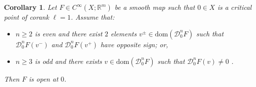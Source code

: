 \documentclass[12pt, reqno]{amsart}
\theoremstyle{plain}
\newtheorem {corollary} [theorem]{Corollary}
\theoremstyle{definition}
\theoremstyle{remark}
\numberwithin{equation}{section}
\newcommand{\R}{\mathbb{R}}
\newcommand{\0}{\theta}
\newcommand{\1}{{-1}}
\renewcommand{\l}{\ell}
\renewcommand{\=}{\coloneqq}
\renewcommand{\.}{\dots}
\newcommand{\mc}{\mathcal}
\newcommand{\dom}{\mathrm{dom}}
\begin{document}
\begin{corollary}
\label{REGONO}{\color{black}
Let $ F\in C^\infty(X;\R^m)$ be a smooth map such that  
$0\in X$ is a critical point of corank $\l=1$. }Assume that: 
        \begin{itemize}
		\item[i)] $n\geq 2$ is even and there exist $2$ elements $v^{\pm} \in \dom(\mc D_0^n F)$ such that 
		$\mc D_0^n F(v^-) $ and $\mc D_0^nF(v^+)$
		have opposite sign; or,
		 \item[ii)] $n\geq 3$ is odd and there exists $v \in \dom(\mc D_0^n F)$ such that $\mc D_0^nF(v)\neq 0$ .
		    \end{itemize} 
Then $F$ is open at $0$.
\end{corollary}





























 



 
 
 
 
 
 
 
 
 
 
 
 
 
 
 
 
 
 
 
 
 
 
 
 
 
 
 
 
 
 
 
 
 
 
 
 
 
 
 
 
 
 
 
 
 
 
 
 
 
 
 
 
\end{document}
